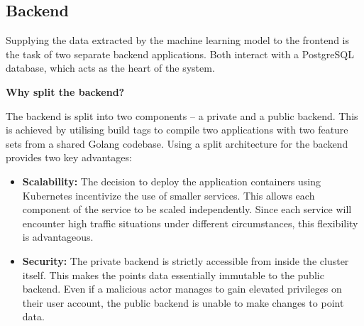 \subsection{Backend}

Supplying the data extracted by the machine learning model to the frontend is
the task of two separate backend applications. Both interact with a PostgreSQL
database, which acts as the heart of the system.

\noindent{}\textbf{Why split the backend?}

\noindent{}The backend is split into two components -- a private and a public
backend. This is achieved by utilising build tags to compile two applications
with two feature sets from a shared Golang codebase. Using a split architecture
for the backend provides two key advantages:

\vspace{-3mm}
\begin{itemize}
  \item{\textbf{Scalability:} The decision to deploy the application containers
  using Kubernetes incentivize the use of smaller services. This allows each
  component of the service to be scaled independently. Since each service will
  encounter high traffic situations under different circumstances, this
  flexibility is advantageous.}

  \item{\textbf{Security:} The private backend is strictly accessible from
  inside the cluster itself. This makes the points data essentially immutable to
  the public backend. Even if a malicious actor manages to gain elevated
  privileges on their user account, the public backend is unable to make changes
  to point data.}
\end{itemize}
\vspace{-3mm}

\begin{figure}[h]
\end{figure}

